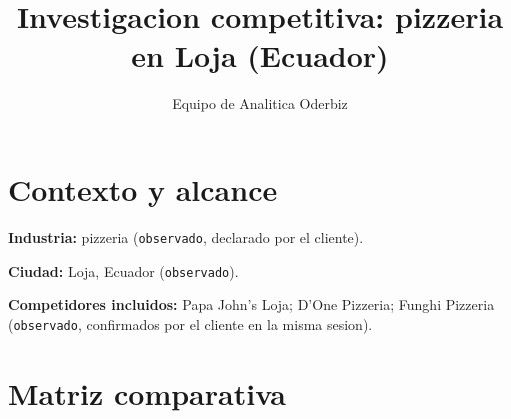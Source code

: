 \documentclass[9pt,a4paper,twocolumn,twoside]{tau-class/tau}
\title{Investigacion competitiva: pizzeria en Loja (Ecuador)}
\author[a,1]{Equipo de Analitica Oderbiz}
\affil[a]{Unidad de Inteligencia Comercial}
\begin{document}
\maketitle
\thispagestyle{firststyle}

\section{Contexto y alcance}

\textbf{Industria:} pizzeria (\texttt{observado}, declarado por el cliente).

\textbf{Ciudad:} Loja, Ecuador (\texttt{observado}).

\textbf{Competidores incluidos:} Papa John's Loja; D'One Pizzeria; Funghi Pizzeria (\texttt{observado}, confirmados por el cliente en la misma sesion).

\section{Matriz comparativa}
\end{document}
